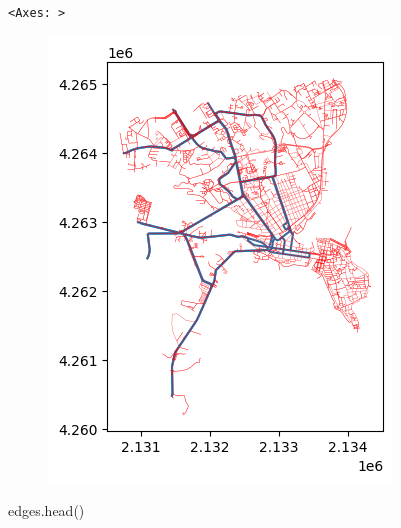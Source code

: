 \documentclass[
  letterpaper,
  DIV=11,
  numbers=noendperiod]{scrreprt}
\newenvironment{Shaded}{\begin{snugshade}}{\end{snugshade}}
\newcommand{\NormalTok}[1]{\textcolor[rgb]{0.00,0.23,0.31}{#1}}
\begin{document}
\begin{verbatim}
<Axes: >
\end{verbatim}

\begin{figure}[H]

{\centering \includegraphics{labs/w07_OSM_files/figure-pdf/cell-23-output-2.png}

}

\end{figure}

\begin{Shaded}
\begin{Highlighting}[]
\NormalTok{edges.head()}
\end{Highlighting}
\end{Shaded}
\end{document}
